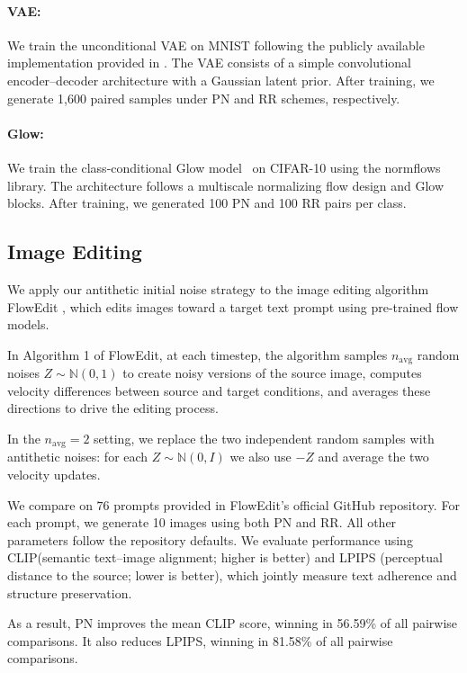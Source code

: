 \documentclass[12pt]{article}
\newcommand{\0}{\mathbf{0}}
\begin{document}
\paragraph{VAE:}

We train the unconditional VAE on MNIST following the publicly available implementation provided in \citet{Francis2022Repo}. The VAE consists of a simple convolutional encoder–decoder architecture with a Gaussian latent prior. After training, we generate 1,600 paired samples under PN and RR schemes, respectively. 

\paragraph{Glow:}

We train the class-conditional Glow model~\citep{kingma2018glow} on CIFAR-10 using the normflows library. The architecture follows a multiscale normalizing flow design and Glow blocks. After training, we generated 100 PN and 100 RR pairs per class.


\subsection{Image Editing}\label{subsec: image editing}

We apply our antithetic initial noise strategy to the image editing algorithm FlowEdit \citep{kulikov2024flowedit}, which edits images toward a target text prompt using pre-trained flow models.

In Algorithm 1 of FlowEdit, at each timestep, the algorithm samples $n_{\text{avg}}$ random noises $Z \sim \mathbb{N}(0,1)$ to create noisy versions of the source image, computes velocity differences between source and target conditions, and averages these directions to drive the editing process.

In the $n_{\text{avg}}=2$ setting, we replace the two independent random samples with antithetic noises: for each $Z\sim\mathbb{N}(0,I)$ we also use $-Z$ and average the two velocity updates.

We compare on $76$ prompts provided in FlowEdit’s official GitHub repository. For each prompt, we generate 10 images using both PN and RR. All other parameters follow the repository defaults. We evaluate performance using CLIP(semantic text–image alignment; higher is better) and LPIPS (perceptual distance to the source; lower is better), which jointly measure text adherence and structure preservation.

As a result, PN improves the mean CLIP score, winning in 56.59\% of all pairwise comparisons. It also reduces LPIPS, winning in 81.58\% of all pairwise comparisons.
\end{document}
